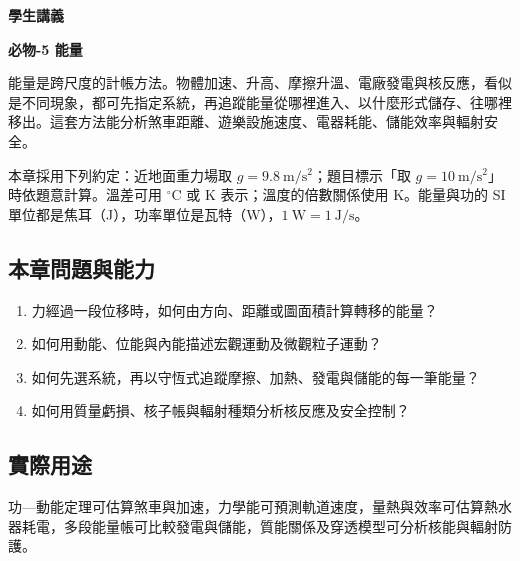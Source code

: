 \documentclass[11pt,a4paper]{article}
\providecommand{\tightlist}{%
  \setlength{\itemsep}{0pt}\setlength{\parskip}{0pt}}
\begin{document}
\begin{tcolorbox}[
  enhanced,colback=white,colframe=HandoutBlue,boxrule=1.1pt,arc=2mm,
  borderline west={3pt}{0pt}{HandoutBlue},left=5mm,right=4mm,top=4mm,bottom=4mm
]
{\sffamily\small\bfseries\color{HandoutBlue}學生講義}\par
{\sffamily\bfseries\LARGE\color{HandoutInk}必物-5 能量}\par
\vspace{0.35em}{\large 用同一套能量帳連接機械運動、溫度、發電與核反應}\par
{}\par
{}\par
\end{tcolorbox}


能量是跨尺度的計帳方法。物體加速、升高、摩擦升溫、電廠發電與核反應，看似是不同現象，都可先指定系統，再追蹤能量從哪裡進入、以什麼形式儲存、往哪裡移出。這套方法能分析煞車距離、遊樂設施速度、電器耗能、儲能效率與輻射安全。

本章採用下列約定：近地面重力場取 \(g=9.8\ \mathrm{m/s^2}\)；題目標示「取 \(g=10\ \mathrm{m/s^2}\)」時依題意計算。溫差可用 \(^\circ\mathrm C\) 或 K 表示；溫度的倍數關係使用 K。能量與功的 SI 單位都是焦耳（J），功率單位是瓦特（W），\(1\ \mathrm W=1\ \mathrm{J/s}\)。

\begin{HandoutLearningMap}

\subsection{本章問題與能力}\label{ux672cux7ae0ux554fux984cux8207ux80fdux529b}

\begin{enumerate}
\def\labelenumi{\arabic{enumi}.}
\tightlist
\item
  力經過一段位移時，如何由方向、距離或圖面積計算轉移的能量？
\item
  如何用動能、位能與內能描述宏觀運動及微觀粒子運動？
\item
  如何先選系統，再以守恆式追蹤摩擦、加熱、發電與儲能的每一筆能量？
\item
  如何用質量虧損、核子帳與輻射種類分析核反應及安全控制？
\end{enumerate}

\subsection{實際用途}\label{ux5be6ux969bux7528ux9014}

功---動能定理可估算煞車與加速，力學能可預測軌道速度，量熱與效率可估算熱水器耗電，多段能量帳可比較發電與儲能，質能關係及穿透模型可分析核能與輻射防護。

\end{HandoutLearningMap}
\end{document}
